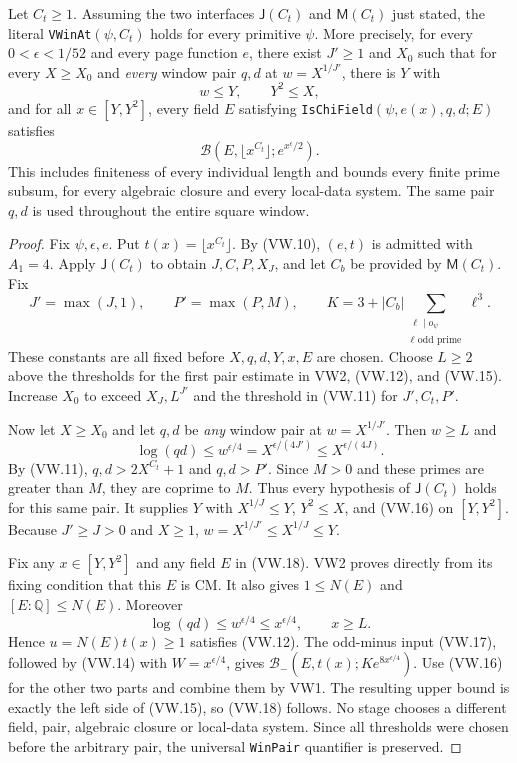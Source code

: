 \begin{theorem}
\label{thm:vw-closed}
Let $C_t\ge1$.  Assuming the two interfaces $\mathsf J(C_t)$ and
$\mathsf M(C_t)$ just stated, the literal \texttt{VWinAt}$(\psi,C_t)$
holds for every primitive $\psi$.
More precisely, for every $0<\epsilon<1/52$ and every page function
$e$, there exist $J'\ge1$ and $X_0$ such that for every $X\ge X_0$
and \emph{every} window pair $q,d$ at $w=X^{1/J'}$, there is $Y$ with
\[
 w\le Y,\qquad Y^2\le X,
\]
and for all $x\in[Y,Y^2]$, every field $E$ satisfying
\texttt{IsChiField}$(\psi,e(x),q,d;E)$ satisfies
\[
       \mathcal B(E,\lfloor x^{C_t}\rfloor;e^{x^\epsilon/2}).
       \tag{VW.18}
\]
This includes finiteness of every individual length and bounds every
finite prime subsum, for every algebraic closure and every local-data
system.  The same pair $q,d$ is used throughout the entire square window.
\end{theorem}

\begin{proof}
Fix $\psi,\epsilon,e$.  Put $t(x)=\lfloor x^{C_t}\rfloor$.
By (VW.10), $(e,t)$ is admitted with $A_1=4$.
Apply $\mathsf J(C_t)$ to obtain $J,C,P,X_J$, and let $C_b$ be
provided by $\mathsf M(C_t)$.  Fix
\[
 J'=\max(J,1),\qquad P'=\max(P,M),\qquad
 K=3+|C_b|\sum_{\substack{\ell\mid o_\psi\\\ell\text{ odd prime}}}\ell^3.
\]
These constants are all fixed before $X,q,d,Y,x,E$ are chosen.
Choose $L\ge2$ above the thresholds for the first pair estimate in
VW2, (VW.12), and (VW.15).  Increase $X_0$ to exceed
$X_J,L^{J'}$ and the threshold in (VW.11) for $J',C_t,P'$.

Now let $X\ge X_0$ and let $q,d$ be \emph{any} window pair at
$w=X^{1/J'}$.  Then $w\ge L$ and
\[
 \log(qd)\le w^{\epsilon/4}
       =X^{\epsilon/(4J')}\le X^{\epsilon/(4J)}.
\]
By (VW.11), $q,d>2X^{C_t}+1$ and $q,d>P'$.  Since $M>0$ and these
primes are greater than $M$, they are coprime to $M$.  Thus every
hypothesis of $\mathsf J(C_t)$ holds for this same pair.  It supplies
$Y$ with $X^{1/J}\le Y$, $Y^2\le X$, and (VW.16) on $[Y,Y^2]$.
Because $J'\ge J>0$ and $X\ge1$,
$w=X^{1/J'}\le X^{1/J}\le Y$.

Fix any $x\in[Y,Y^2]$ and any field $E$ in (VW.18).
VW2 proves directly from its fixing condition that this $E$ is CM.
It also gives $1\le N(E)$ and $[E:\mathbb Q]\le N(E)$.
Moreover
\[
 \log(qd)\le w^{\epsilon/4}\le x^{\epsilon/4},\qquad x\ge L.
\]
Hence $u=N(E)t(x)\ge1$ satisfies (VW.12).
The odd-minus input (VW.17), followed by (VW.14) with
$W=x^{\epsilon/4}$, gives
$\mathcal B_-(E,t(x);Ke^{8x^{\epsilon/4}})$.
Use (VW.16) for the other two parts and combine them by VW1.
The resulting upper bound is exactly the left side of (VW.15), so
(VW.18) follows.  No stage chooses a different field, pair, algebraic
closure or local-data system.  Since all thresholds were chosen before
the arbitrary pair, the universal \texttt{WinPair} quantifier is preserved.
\end{proof}

